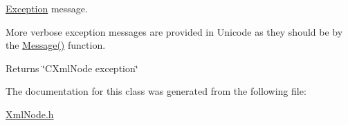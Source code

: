 \hyperlink{classxmlnode_1_1_c_xml_node_1_1_exception}{Exception} message. 

More verbose exception messages are provided in Unicode as they should be by the \hyperlink{classxmlnode_1_1_c_xml_node_1_1_exception_a29271ad0ec50958663200f60aaae97b2}{Message()} function. \begin{DoxyReturn}{Returns}
\char`\"{}\+C\+Xml\+Node exception\char`\"{} 
\end{DoxyReturn}


The documentation for this class was generated from the following file\+:\begin{DoxyCompactItemize}
\item 
\hyperlink{_xml_node_8h}{Xml\+Node.\+h}\end{DoxyCompactItemize}
